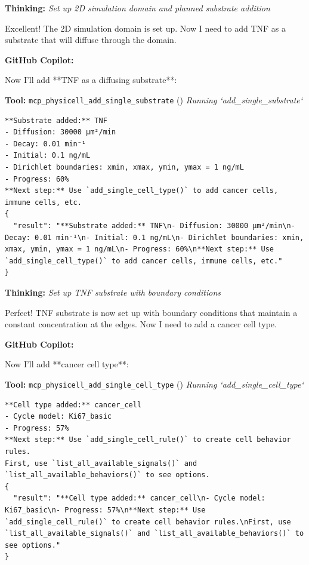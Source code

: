 \documentclass[11pt,a4paper]{article}
\begin{document}
\begin{thinkbox}
\textbf{Thinking:} \textit{Set up 2D simulation domain and planned substrate addition}

Excellent! The 2D simulation domain is set up. Now I need to add TNF as a substrate that will diffuse through the domain.

\end{thinkbox}
\begin{copilotbox}
\textbf{GitHub Copilot:}

Now I'll add **TNF as a diffusing substrate**:

\end{copilotbox}
\begin{toolokbox}
\textbf{Tool:} \texttt{mcp\_physicell\_add\_single\_substrate} (\checkmark)
\textit{Running `add\_single\_substrate`}
\begin{lstlisting}
**Substrate added:** TNF
- Diffusion: 30000 μm²/min
- Decay: 0.01 min⁻¹
- Initial: 0.1 ng/mL
- Dirichlet boundaries: xmin, xmax, ymin, ymax = 1 ng/mL
- Progress: 60%
**Next step:** Use `add_single_cell_type()` to add cancer cells, immune cells, etc.
{
  "result": "**Substrate added:** TNF\n- Diffusion: 30000 μm²/min\n- Decay: 0.01 min⁻¹\n- Initial: 0.1 ng/mL\n- Dirichlet boundaries: xmin, xmax, ymin, ymax = 1 ng/mL\n- Progress: 60%\n**Next step:** Use `add_single_cell_type()` to add cancer cells, immune cells, etc."
}
\end{lstlisting}
\end{toolokbox}
\begin{thinkbox}
\textbf{Thinking:} \textit{Set up TNF substrate with boundary conditions}

Perfect! TNF substrate is now set up with boundary conditions that maintain a constant concentration at the edges. Now I need to add a cancer cell type.

\end{thinkbox}
\begin{copilotbox}
\textbf{GitHub Copilot:}

Now I'll add **cancer cell type**:

\end{copilotbox}
\begin{toolokbox}
\textbf{Tool:} \texttt{mcp\_physicell\_add\_single\_cell\_type} (\checkmark)
\textit{Running `add\_single\_cell\_type`}
\begin{lstlisting}
**Cell type added:** cancer_cell
- Cycle model: Ki67_basic
- Progress: 57%
**Next step:** Use `add_single_cell_rule()` to create cell behavior rules.
First, use `list_all_available_signals()` and `list_all_available_behaviors()` to see options.
{
  "result": "**Cell type added:** cancer_cell\n- Cycle model: Ki67_basic\n- Progress: 57%\n**Next step:** Use `add_single_cell_rule()` to create cell behavior rules.\nFirst, use `list_all_available_signals()` and `list_all_available_behaviors()` to see options."
}
\end{lstlisting}
\end{toolokbox}
\end{document}
